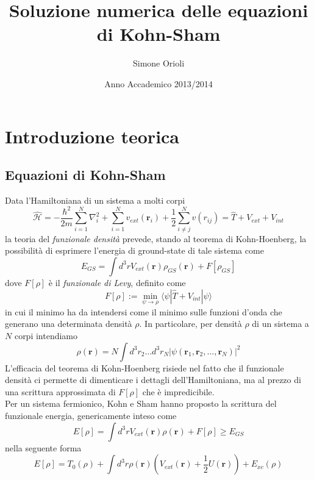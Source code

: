 \documentclass[11pt,a4paper]{article}
\begin{document}
\title{Soluzione numerica delle equazioni di Kohn-Sham} 
\author{Simone Orioli} 
\date{Anno Accademico 2013/2014} 
\maketitle
\tableofcontents
\newpage

\section{Introduzione teorica}
\subsection{Equazioni di Kohn-Sham}
Data l'Hamiltoniana di un sistema a molti corpi
\begin{equation}
\mathcal{\hat{H}} = -\frac{\hbar^2}{2m}\sum_{i=1}^N \nabla_i^2 + \sum_{i=1}^N v_{ext}(\textbf{r}_i) + \frac{1}{2}\sum_{i\not=j}^N v(r_{ij}) = \hat{T} + V_{ext} + V_{int}
\end{equation} 
la teoria del \emph{funzionale densità} prevede, stando al teorema di Kohn-Hoenberg, la possibilità di esprimere l'energia di ground-state di tale sistema come
\begin{equation}
E_{GS} = \int d^3 r V_{ext}(\textbf{r})\rho_{GS}(\textbf{r}) + F[\rho_{GS}]
\end{equation}
dove $F[\rho]$ è il \emph{funzionale di Levy}, definito come
\begin{equation}
F[\rho] := \min_{\psi \to \rho} \langle \psi | \hat{T} + V_{int} | \psi \rangle
\end{equation}
in cui il minimo ha da intendersi come il minimo sulle funzioni d'onda che generano una determinata densità $\rho$. In particolare, per densità $\rho$ di un sistema a $N$ corpi intendiamo
\[
\rho(\textbf{r}) = N \int d^3r_2\ldots d^3r_N |\psi(\textbf{r}_1,\textbf{r}_2,\ldots ,\textbf{r}_N)|^2
\]
L'efficacia del teorema di Kohn-Hoenberg risiede nel fatto che il funzionale densità ci permette di dimenticare i dettagli dell'Hamiltoniana, ma al prezzo di una scrittura approssimata di $F[\rho]$ che è impredicibile. 
\\
Per un sistema fermionico, Kohn e Sham hanno proposto la scrittura del funzionale energia, genericamente inteso come
\[
E[\rho] = \int d^3 r V_{ext}(\textbf{r})\rho(\textbf{r}) + F[\rho] \geq E_{GS}
\]
nella seguente forma
\begin{equation}
E[\rho] = T_0(\rho) + \int d^3r \rho(\textbf{r}) \left( V_{ext}(\textbf{r})+\frac{1}{2}U(\textbf{r}) \right) + E_{xc}(\rho)
\end{equation}
\end{document}
